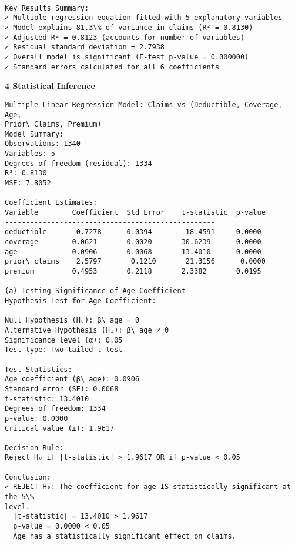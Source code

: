\documentclass[8pt, twocolumn]{extarticle}
\begin{document}
    \begin{Verbatim}[commandchars=\\\{\}]

Key Results Summary:
✓ Multiple regression equation fitted with 5 explanatory variables
✓ Model explains 81.3\% of variance in claims (R² = 0.8130)
✓ Adjusted R² = 0.8123 (accounts for number of variables)
✓ Residual standard deviation = 2.7938
✓ Overall model is significant (F-test p-value = 0.000000)
✓ Standard errors calculated for all 6 coefficients
    \end{Verbatim}
    \textbf{4 Statistical Inference}
    \begin{Verbatim}[commandchars=\\\{\}]
Multiple Linear Regression Model: Claims vs (Deductible, Coverage, Age,
Prior\_Claims, Premium)
Model Summary:
Observations: 1340
Variables: 5
Degrees of freedom (residual): 1334
R²: 0.8130
MSE: 7.8052

Coefficient Estimates:
Variable        Coefficient  Std Error    t-statistic  p-value
--------------------------------------------------
deductible      -0.7278      0.0394       -18.4591     0.0000
coverage        0.0621       0.0020       30.6239      0.0000
age             0.0906       0.0068       13.4010      0.0000
prior\_claims    2.5797       0.1210       21.3156      0.0000
premium         0.4953       0.2118       2.3382       0.0195

(a) Testing Significance of Age Coefficient
Hypothesis Test for Age Coefficient:

Null Hypothesis (H₀): β\_age = 0
Alternative Hypothesis (H₁): β\_age ≠ 0
Significance level (α): 0.05
Test type: Two-tailed t-test

Test Statistics:
Age coefficient (β\_age): 0.0906
Standard error (SE): 0.0068
t-statistic: 13.4010
Degrees of freedom: 1334
p-value: 0.0000
Critical value (±): 1.9617

Decision Rule:
Reject H₀ if |t-statistic| > 1.9617 OR if p-value < 0.05

Conclusion:
✓ REJECT H₀: The coefficient for age IS statistically significant at the 5\%
level.
  |t-statistic| = 13.4010 > 1.9617
  p-value = 0.0000 < 0.05
  Age has a statistically significant effect on claims.
    \end{Verbatim}
\end{document}
